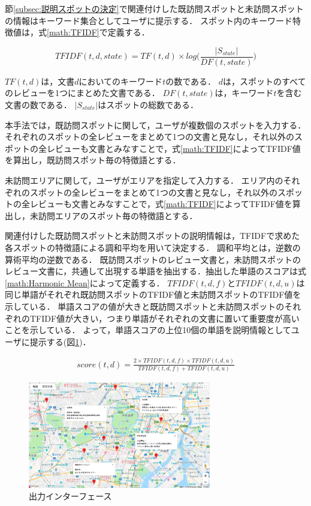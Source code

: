 \documentclass{deimj}
\begin{document}
節\ref{subsec:説明スポットの決定}で関連付けした既訪問スポットと未訪問スポットの情報はキーワード集合としてユーザに提示する．
スポット内のキーワード特徴値は，式\ref{math:TFIDF}で定義する．

\begin{equation}
  TFIDF(t,d,state) = TF(t,d) \times log\Biggr(\frac{|S_{state}|}{DF(t,state)}\Biggr)
  \label{math:TFIDF}
\end{equation}

$TF(t,d)$は，文書$d$においてのキーワード$t$の数である．
$d$は，スポットのすべてのレビューを1つにまとめた文書である．
$DF(t,state)$は，キーワード$t$を含む文書の数である．
$|S_{state}|$はスポットの総数である．

本手法では，既訪問スポットに関して，ユーザが複数個のスポットを入力する．
それぞれのスポットの全レビューをまとめて1つの文書と見なし，それ以外のスポットの全レビューも文書とみなすことで，式\ref{math:TFIDF}によってTFIDF値を算出し，既訪問スポット毎の特徴語とする．

未訪問エリアに関して，ユーザがエリアを指定して入力する．
エリア内のそれぞれのスポットの全レビューをまとめて1つの文書と見なし，それ以外のスポットの全レビューも文書とみなすことで，式\ref{math:TFIDF}によってTFIDF値を算出し，未訪問エリアのスポット毎の特徴語とする．

関連付けした既訪問スポットと未訪問スポットの説明情報は，TFIDFで求めた各スポットの特徴語による調和平均を用いて決定する．
調和平均とは，逆数の算術平均の逆数である．
既訪問スポットのレビュー文書と，未訪問スポットのレビュー文書に，共通して出現する単語を抽出する．抽出した単語のスコアは式\ref{math:Harmonic Mean}によって定義する．
$TFIDF(t,d,f)$と$TFIDF(t,d,u)$は同じ単語がそれぞれ既訪問スポットのTFIDF値と未訪問スポットのTFIDF値を示している．
単語スコアの値が大きと既訪問スポットと未訪問スポットのそれぞれのTFIDF値が大きい，つまり単語がそれぞれの文書に置いて重要度が高いことを示している．
よって，単語スコアの上位10個の単語を説明情報としてユーザに提示する(図\ref{fig:photo_map})．

\begin{eqnarray}
  score(t,d) = \frac{2 \times TFIDF(t,d,f) \times TFIDF(t,d,u)}{TFIDF(t,d,f) + TFIDF(t,d,u)}
  \label{math:Harmonic Mean}
\end{eqnarray}

\begin{figure}[t]
  \begin{center}
    \includegraphics[clip,width=8.0cm]{picture/Photo_Map.png}
    \caption{出力インターフェース}
    \label{fig:photo_map}
   \end{center}
\end{figure}
\end{document}

